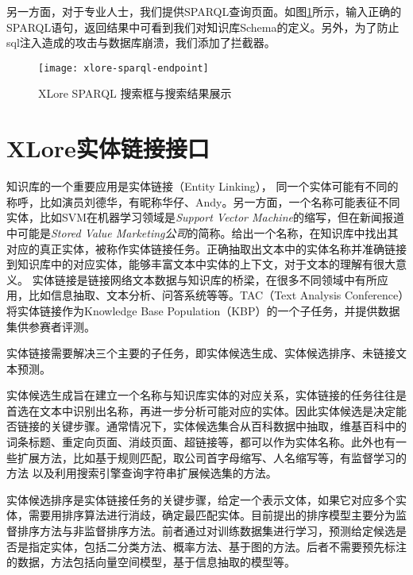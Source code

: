 另一方面，对于专业人士，我们提供SPARQL查询页面。如图\ref{fig:xlore-sparql-endpoint}所示，输入正确的SPARQL语句，返回结果中可看到我们对知识库Schema的定义。另外，为了防止sql注入造成的攻击与数据库崩溃，我们添加了拦截器。

\begin{figure}[ht]
  \centering
  \texttt{[image: xlore-sparql-endpoint]}
  \caption{XLore SPARQL 搜索框与搜索结果展示}
  \label{fig:xlore-sparql-endpoint}
\end{figure}

\section{XLore实体链接接口}
\label{sec5:entity-linking-api}

知识库的一个重要应用是实体链接（Entity Linking），
同一个实体可能有不同的称呼，比如演员刘德华，有昵称华仔、Andy。另一方面，一个名称可能表征不同实体，比如SVM在机器学习领域是\textit{Support Vector Machine}的缩写，但在新闻报道中可能是\textit{Stored Value Marketing公司}的简称。给出一个名称，在知识库中找出其对应的真正实体，被称作{\heiti 实体链接}任务。正确抽取出文本中的实体名称并准确链接到知识库中的对应实体，能够丰富文本中实体的上下文，对于文本的理解有很大意义。
实体链接是链接网络文本数据与知识库的桥梁，在很多不同领域中有所应用，比如信息抽取\cite{lin2012entity,nakashole2012patty}、文本分析\cite{gattani2013entity}、问答系统\cite{gattani2013entity}等等。TAC（Text Analysis Conference）将实体链接作为Knowledge Base Population（KBP）的一个子任务，并提供数据集供参赛者评测。

实体链接需要解决三个主要的子任务，即实体候选生成、实体候选排序、未链接文本预测。

{\heiti 实体候选生成}旨在建立一个名称与知识库实体的对应关系，实体链接的任务往往是首选在文本中识别出名称，再进一步分析可能对应的实体。因此实体候选是决定能否链接的关键步骤。通常情况下，实体候选集合从百科数据中抽取\cite{shen2012linden,shen2013linking}，维基百科中的词条标题、重定向页面、消歧页面、超链接等，都可以作为实体名称。此外也有一些扩展方法，比如基于规则匹配\cite{han2009nlpr_kbp,lehmann2010lcc}，取公司首字母缩写、人名缩写等，有监督学习的方法\cite{zhang2011entity} 以及利用搜索引擎查询字符串扩展候选集的方法\cite{dredze2010entity, monahan2011cross}。

{\heiti 实体候选排序}是实体链接任务的关键步骤，给定一个表示文体，如果它对应多个实体，需要用排序算法进行消歧，确定最匹配实体。目前提出的排序模型主要分为监督排序方法与非监督排序方法。前者通过对训练数据集进行学习，预测给定候选是否是指定实体，包括二分类方法\cite{lehmann2010lcc,monahan2011cross,chen2011collaborative}、概率方法\cite{han2011generative}、基于图的方法\cite{han2011collective}。后者不需要预先标注的数据，方法包括向量空间模型\cite{han2009nlpr_kbp}，基于信息抽取的模型\cite{varma2009iiit,gottipati2011linking}等。

